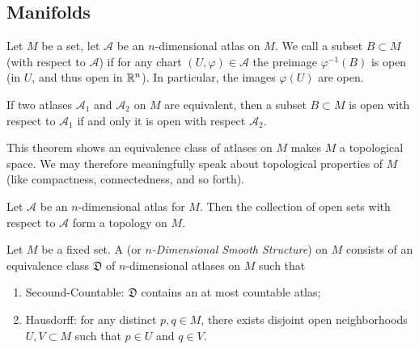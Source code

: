 \subsection{Manifolds}

\begin{definition}
  Let $M$ be a set, let $\mathcal{A}$ be an $n$-dimensional atlas on
  $M$.
  We call a subset $B\subset M$  (with respect to
  $\mathcal{A}$) if for any chart $(U,\varphi)\in\mathcal{A}$ the
  preimage $\varphi^{-1}(B)$ is open (in $U$, and thus open in $\mathbb{R}^{n}$).
  In particular, the images $\varphi(U)$ are open.
\end{definition}

\begin{theorem}
  If two atlases $\mathcal{A}_{1}$ and $\mathcal{A}_{2}$ on $M$ are equivalent,
  then a subset $B\subset M$ is open with respect to $\mathcal{A}_{1}$
  if and only it is open with respect $\mathcal{A}_{2}$.
\end{theorem}

\begin{remark}
  This theorem shows an equivalence class of atlases on $M$ makes $M$ a
  topological space. We may therefore meaningfully speak about
  topological properties of $M$ (like compactness, connectedness, and so
  forth). 
\end{remark}

\begin{corollary}
  Let $\mathcal{A}$ be an $n$-dimensional atlas for $M$.
  Then the collection of open sets with respect to $\mathcal{A}$ form a
  topology on $M$.
\end{corollary}

\begin{definition}
  Let $M$ be a fixed set. A 
  (or \emph{$n$-Dimensional Smooth Structure})
  on $M$ consists of an equivalence class $\mathfrak{D}$ of
  $n$-dimensional atlases on $M$ such that
  \begin{enumerate}
  \item Secound-Countable: $\mathfrak{D}$ contains an at most countable atlas;
  \item Hausdorff: for any distinct $p,q\in M$, there exists disjoint
    open neighborhoods $U,V\subset M$ such that $p\in U$ and $q\in V$.
  \end{enumerate}
\end{definition}

